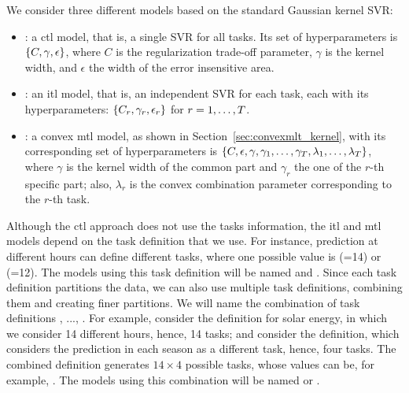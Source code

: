 %
We consider three different models based on the standard Gaussian kernel SVR:
\begin{itemize}
    \item {}: a \acrshort{ctl} model, that is, a single SVR for all tasks. Its set of hyperparameters is $\left\{C, \gamma, \epsilon\right\}$, where $C$ is the regularization trade-off parameter, $\gamma$ is the kernel width, and $\epsilon$ the width of the error insensitive area.
    \item {}: an \acrshort{itl} model, that is, an independent SVR for each task, each with its hyperparameters: $\left\{C_r, \gamma_r, \epsilon_r\right\}$ for $r=1, \ldots, T$.
    \item {}: a convex \acrshort{mtl} model, as shown in Section~\ref{sec:convexmlt_kernel}, with its corresponding set of hyperparameters is $\left\{C, \epsilon, \gamma, \gamma_1, \ldots, \gamma_T, \lambda_1, \ldots, \lambda_T\right\}$, where $\gamma$ is the kernel width of the common part and $\gamma_r$ the one of the $r$-th specific part; also, $\lambda_r$ is the convex combination parameter corresponding to the $r$-th task.
\end{itemize}
%
Although the \acrshort{ctl} approach does not use the tasks information, the \acrshort{itl} and \acrshort{mtl} models depend on the task definition that we use. For instance, prediction at different hours can define different tasks, where one possible value is (=14) or (=12). The models using this task definition will be named  and . 
%
Since each task definition partitions the data, we can also use multiple task definitions, combining them and creating finer partitions. 
We will name  the combination of task definitions , ..., . For example, consider the  definition for solar energy, in which we consider 14 different hours, hence, 14 tasks; and consider the  definition, which considers the prediction in each season as a different task, hence, four tasks. The combined definition  generates $14 \times 4$ possible tasks, whose values can be, for example, .
The models using this combination will be named  or .

